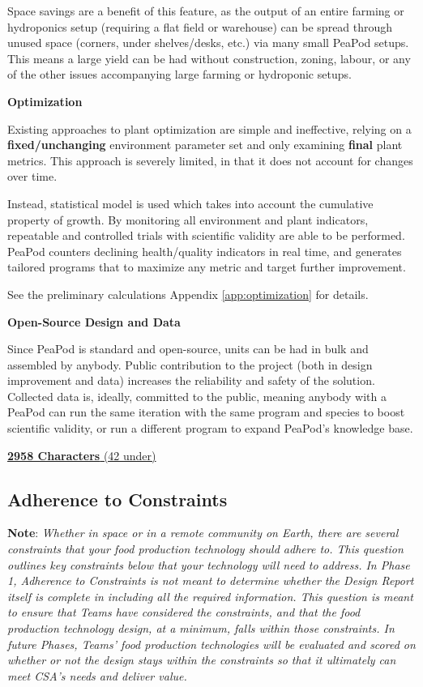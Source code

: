 \documentclass{../tex/report}
\begin{document}
Space savings are a benefit of this feature, as the output of an entire farming or hydroponics setup (requiring a flat field or warehouse) can be spread through unused space (corners, under shelves/desks, etc.) via many small PeaPod setups. This means a large yield can be had without construction, zoning, labour, or any of the other issues accompanying large farming or hydroponic setups.

\textbf{Optimization}

Existing approaches to plant optimization are simple and ineffective, relying on a \textbf{fixed/unchanging} environment parameter set and only examining \textbf{final} plant metrics. This approach is severely limited, in that it does not account for changes over time.

Instead, statistical model is used which takes into account the cumulative property of growth. By monitoring all environment and plant indicators, repeatable and controlled trials with scientific validity are able to be performed. PeaPod counters declining health/quality indicators in real time, and generates tailored programs that to maximize any metric and target further improvement.

See the preliminary calculations Appendix \ref{app:optimization} for details.

\textbf{Open-Source Design and Data}

Since PeaPod is standard and open-source, units can be had in bulk and assembled by anybody. Public contribution to the project (both in design improvement and data) increases the reliability and safety of the solution. Collected data is, ideally, committed to the public, meaning anybody with a PeaPod can run the same iteration with the same program and species to boost scientific validity, or run a different program to expand PeaPod's knowledge base.

\uline{\textbf{2958 Characters} (42 under)}

\vspace{0.5cm}

\subsection{Adherence to Constraints}
\label{sec:constraints}

\textbf{Note}: \textit{Whether in space or in a remote community on Earth, there are several constraints that your food production technology should adhere to. This question outlines key constraints below that your technology will need to address. In Phase 1, Adherence to Constraints is not meant to determine whether the Design Report itself is complete in including all the required information. This question is meant to ensure that Teams have considered the constraints, and that the food production technology design, at a minimum, falls within those constraints. In future Phases, Teams’ food production technologies will be evaluated and scored on whether or not the design stays within the constraints so that it ultimately can meet CSA’s needs and deliver value.}
\end{document}
